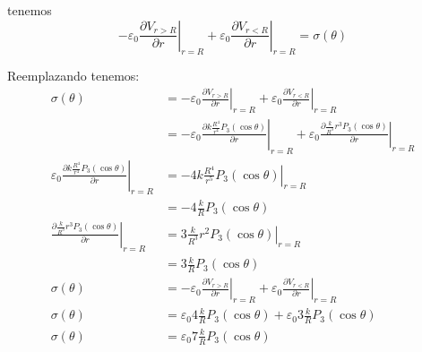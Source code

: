 \documentclass{report}
\begin{document}
tenemos
\[
	-\varepsilon_0 \left.\frac{\partial V_{r > R}}{\partial r}\right|_{r=R} + \varepsilon_0 \left.\frac{\partial V_{r < R}}{\partial r}\right|_{r=R} = \sigma(\theta)
\]

Reemplazando tenemos:
\begin{align*}
	\sigma(\theta) &= -\varepsilon_0 \left.\frac{\partial V_{r > R}}{\partial r}\right|_{r=R} + \varepsilon_0 \left.\frac{\partial V_{r < R}}{\partial r}\right|_{r=R}\\
	&= -\varepsilon_0 \left.\frac{\partial k\frac{R^4}{r^4}P_3(\cos\theta)}{\partial r}\right|_{r=R} + \varepsilon_0 \left.\frac{\partial \frac{k}{R^3}r^3 P_3(\cos\theta)}{\partial r}\right|_{r=R} \\
	\varepsilon_0 \left.\frac{\partial k\frac{R^4}{r^4}P_3(\cos\theta)}{\partial r}\right|_{r=R} &= - \left.4 k \frac{R^4}{r^5} P_3(\cos\theta)\right|_{r = R}\\
	&= -4\frac{k}{R}P_3(\cos\theta)\\
	\left.\frac{\partial \frac{k}{R^3}r^3 P_3(\cos\theta)}{\partial r}\right|_{r=R} &= \left. 3\frac{k}{R^3}r^2 P_3(\cos\theta) \right|_{r=R}\\
	&= 3 \frac{k}{R}P_3(\cos\theta)\\
	\sigma(\theta) &= -\varepsilon_0 \left.\frac{\partial V_{r > R}}{\partial r}\right|_{r=R} + \varepsilon_0 \left.\frac{\partial V_{r < R}}{\partial r}\right|_{r=R}\\
	\sigma(\theta) &= \varepsilon_0 4\frac{k}{R}P_3(\cos\theta) + \varepsilon_0 3 \frac{k}{R}P_3(\cos\theta)\\
	\sigma(\theta) &= \varepsilon_0 7\frac{k}{R}P_3(\cos\theta)
\end{align*}
\end{document}
